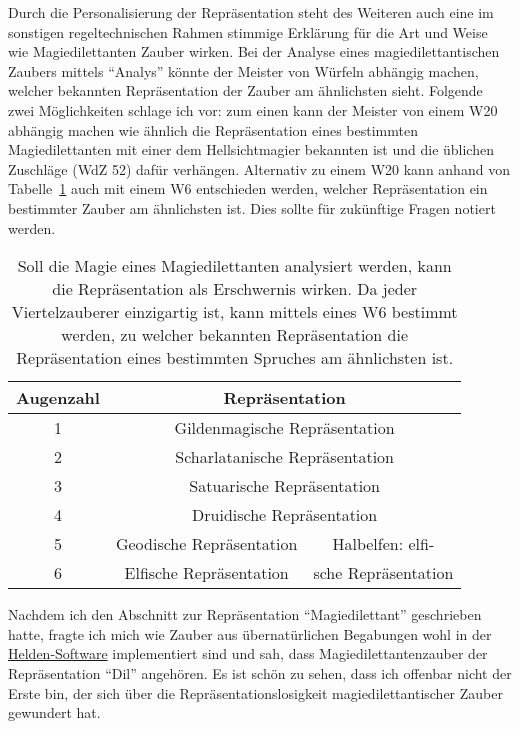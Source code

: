 Durch die Personalisierung der Repräsentation steht des Weiteren auch eine im sonstigen regeltechnischen Rahmen stimmige Erklärung für die Art und Weise wie Magiedilettanten Zauber wirken. Bei der Analyse eines magiedilettantischen Zaubers mittels \enquote{Analys} könnte der Meister von Würfeln abhängig machen, welcher bekannten Repräsentation der Zauber am ähnlichsten sieht. Folgende zwei Möglichkeiten schlage ich vor: zum einen kann der Meister von einem W20 abhängig machen wie ähnlich die Repräsentation eines bestimmten Magiedilettanten mit einer dem Hellsichtmagier bekannten ist und die üblichen Zuschläge (WdZ 52) dafür verhängen. Alternativ zu einem W20 kann anhand von Tabelle~\ref{rep-ueg-w6} auch mit einem W6 entschieden werden, welcher Repräsentation ein bestimmter Zauber am ähnlichsten ist. Dies sollte für zukünftige Fragen notiert werden.
\begin{table}
	\centering
	\caption[Repräsentationsähnlichkeit übernatürlicher Begabung mit 1W6 festlegen]{Soll die Magie eines Magiedilettanten analysiert werden, kann die Repräsentation als Erschwernis wirken. Da jeder Viertelzauberer einzigartig ist, kann mittels eines W6 bestimmt werden, zu welcher bekannten Repräsentation die Repräsentation eines bestimmten Spruches am ähnlichsten ist.\label{rep-ueg-w6}}
	\begin{tabular}{cc|c}
		\toprule
		Augenzahl & \multicolumn{2}{c}{Repräsentation} \\
		\hline
		1 & \multicolumn{2}{c}{Gildenmagische Repräsentation} \\
		2 & \multicolumn{2}{c}{Scharlatanische Repräsentation} \\
		3 & \multicolumn{2}{c}{Satuarische Repräsentation} \\
		4 & \multicolumn{2}{c}{Druidische Repräsentation} \\
		5 & Geodische Repräsentation & Halbelfen: elfi- \\
		6 & Elfische Repräsentation & sche Repräsentation  \\
		\bottomrule
	\end{tabular}
\end{table}

Nachdem ich den Abschnitt zur Repräsentation \enquote{Magiedilettant} geschrieben hatte, fragte ich mich wie Zauber aus übernatürlichen Begabungen wohl in der \href{http://www.helden-software.de/}{Helden-Software} implementiert sind und sah, dass Magiedilettantenzauber der Repräsentation \enquote{Dil} angehören. Es ist schön zu sehen, dass ich offenbar nicht der Erste bin, der sich über die Repräsentationslosigkeit magiedilettantischer Zauber gewundert hat.

